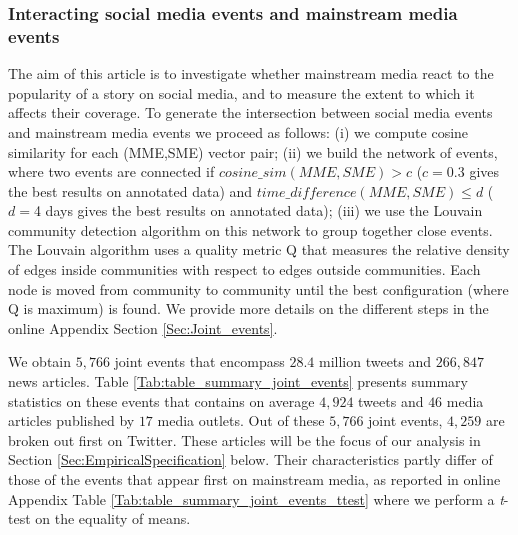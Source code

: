 \subsubsection{Interacting social media events and mainstream media events\label{Sec:Interaction}}

The aim of this article is to investigate whether mainstream media react to the popularity of a story on social media, and to measure the extent to which it affects their coverage.
To generate the intersection between social media events and mainstream media events we proceed as follows: (i) we compute cosine similarity for each (MME,SME) vector pair; (ii) we build the network of events, where two events are connected if $cosine\_sim(MME, SME) > c$ ($c=0.3$ gives the best results on annotated data) and $time\_difference(MME, SME)\leqslant d$ ($d=$4 days gives the best results on annotated data); (iii) we use the Louvain community detection algorithm \citep{Blondeletal2008} on this network to group together close events. The Louvain algorithm uses a quality metric Q that measures the relative density of edges inside communities with respect to edges outside communities. Each node is moved from community to community until the best configuration (where Q is maximum) is found. We provide more details on the different steps in the online Appendix Section \ref{Sec:Joint_events}.

We obtain $5,766$ joint events that encompass $28.4$ million tweets and $266,847$ news articles. Table \ref{Tab:table_summary_joint_events} presents summary statistics on these events that contains on average $4,924$ tweets and $46$ media articles published by $17$ media outlets. Out of these $5,766$ joint events, $4,259$ are broken out first on Twitter. These articles will be the focus of our analysis in Section \ref{Sec:EmpiricalSpecification} below. Their characteristics partly differ of those of the events that appear first on mainstream media, as reported in online Appendix Table \ref{Tab:table_summary_joint_events_ttest} where we perform a \textit{t}-test on the equality of means.


